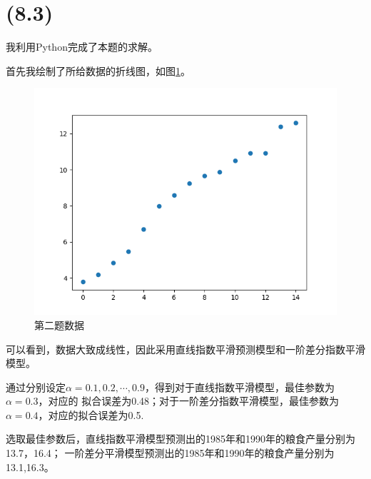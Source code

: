 \documentclass[a4paper]{article}
\begin{document}
\section{(8.3)}
我利用Python完成了本题的求解。

首先我绘制了所给数据的折线图，如图\ref{q2}。
\begin{figure}[!h]
    \centering
    \includegraphics*[width = \textwidth]{q2.png}
    \caption{第二题数据}\label{q2}
\end{figure}

可以看到，数据大致成线性，因此采用直线指数平滑预测模型和一阶差分指数平滑模型。

通过分别设定$\alpha=0.1,0.2,\cdots,0.9$，得到对于直线指数平滑模型，最佳参数为$\alpha=0.3$，对应的
拟合误差为0.48；对于一阶差分指数平滑模型，最佳参数为$\alpha=0.4$，对应的拟合误差为0.5.

选取最佳参数后，直线指数平滑模型预测出的1985年和1990年的粮食产量分别为13.7，16.4；
一阶差分平滑模型预测出的1985年和1990年的粮食产量分别为13.1,16.3。
\end{document}

